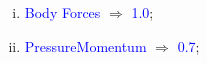 \documentclass[10pt,compress, unknownkeysallowed]{beamer}
\newcommand{\blue}{\textcolor{blue}}
\begin{document}
\begin{frame}
\begin{columns}
\begin{column}[l]{0.5\linewidth}
\begin{enumerate}
\begin{enumerate}[i)]
                        \item<3-> \blue{Body Forces} $\Rightarrow$ \blue{1.0};
                        \item<3-> \blue{PressureMomentum} $\Rightarrow$ \blue{0.7};
                    \end{enumerate}
           \end{enumerate}
        \end{column}
           \begin{column}[l]{0.5\linewidth}
           \end{column}
    \end{columns}
\end{frame}
\end{document}
